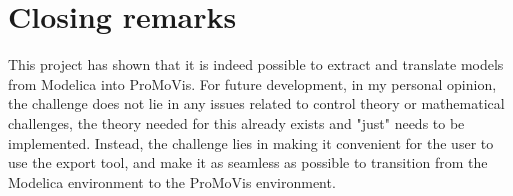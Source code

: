 \section{Closing remarks}
This project has shown that it is indeed possible to extract and translate models from Modelica into ProMoVis. For future development, in my personal opinion, the challenge does not lie in any issues related to control theory or mathematical challenges, the theory needed for this already exists and "just" needs to be implemented. Instead, the challenge lies in making it convenient for the user to use the export tool, and make it as seamless as possible to transition from the Modelica environment to the ProMoVis environment. 
